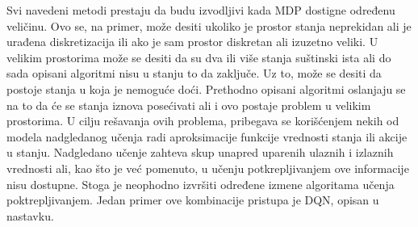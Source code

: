 \par 
Svi navedeni metodi prestaju da budu izvodljivi kada MDP dostigne određenu veličinu. Ovo se, na primer, može desiti ukoliko je prostor stanja neprekidan ali je urađena diskretizacija ili ako je sam prostor diskretan ali izuzetno veliki. U velikim prostorima može se desiti da su dva ili više stanja suštinski ista ali do sada opisani algoritmi nisu u stanju to da zaključe. Uz to, može se desiti da postoje stanja u koja je nemoguće doći. Prethodno opisani algoritmi oslanjaju se na to da će se stanja iznova posećivati ali i ovo postaje problem u velikim prostorima. U cilju rešavanja ovih problema, pribegava se korišćenjem nekih od modela nadgledanog učenja radi aproksimacije funkcije vrednosti stanja ili akcije u stanju. Nadgledano učenje zahteva skup unapred uparenih ulaznih i izlaznih vrednosti ali, kao što je već pomenuto, u učenju potkrepljivanjem ove informacije nisu dostupne. Stoga je neophodno izvršiti određene izmene algoritama učenja poktrepljivanjem. Jedan primer ove kombinacije pristupa je DQN, opisan u nastavku.






